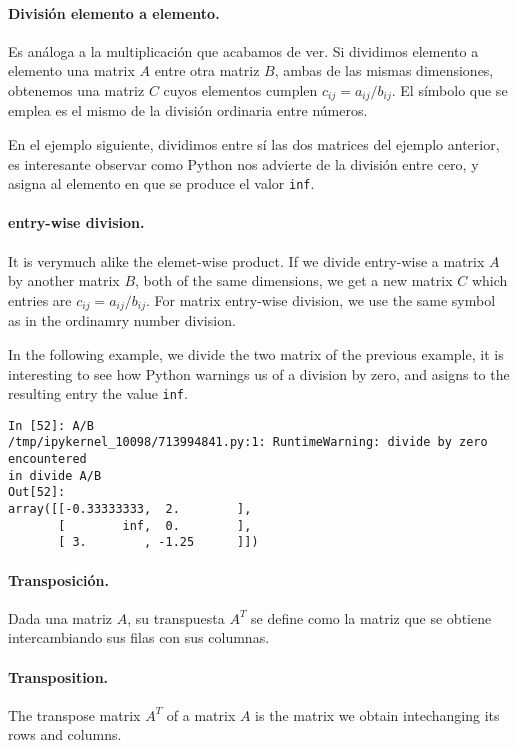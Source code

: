 \begin{paracol}{2}
\paragraph{División elemento a elemento.} Es análoga a la multiplicación que acabamos de ver. Si dividimos elemento a elemento una matrix $A$ entre otra matriz $B$, ambas de las mismas dimensiones, obtenemos una matriz $C$ cuyos elementos cumplen $c_{ij} = a_{ij}/b_{ij}$. El símbolo que se emplea es el mismo de la división ordinaria entre números.

En el ejemplo siguiente, dividimos entre sí las dos matrices del ejemplo anterior, es interesante observar como Python nos advierte de la división entre cero, y asigna al elemento en que se produce el valor \texttt{inf}.

\switchcolumn
\paragraph{entry-wise division.} It is verymuch alike the elemet-wise product. If we divide entry-wise a matrix $A$ by another matrix $B$, both of the same dimensions, we get a new matrix $C$ which entries are $c_{ij}  = a_{ij}/b_{ij}$. For matrix entry-wise division, we use the same symbol as in the ordinamry number division.

In the following example, we divide the two matrix of the previous example, it is interesting to see how Python warnings us of a division by zero, and asigns to the resulting entry the value \texttt{inf}.
  

 
\end{paracol}
\begin{center}
    \begin{minipage}{\textwidth}
        \begin{verbatim}
In [52]: A/B
/tmp/ipykernel_10098/713994841.py:1: RuntimeWarning: divide by zero encountered 
in divide A/B
Out[52]: 
array([[-0.33333333,  2.        ],
       [        inf,  0.        ],
       [ 3.        , -1.25      ]])
\end{verbatim}
\end{minipage}
\end{center}

\begin{paracol}{2}
\paragraph{Transposición.} Dada una matriz $A$, su transpuesta $A^T$ se define como la matriz que se obtiene intercambiando sus filas con sus columnas.
\switchcolumn
\paragraph{Transposition.} The transpose matrix $A^T$ of a matrix $A$ is the matrix we obtain intechanging its rows and columns.      
\end{paracol}


